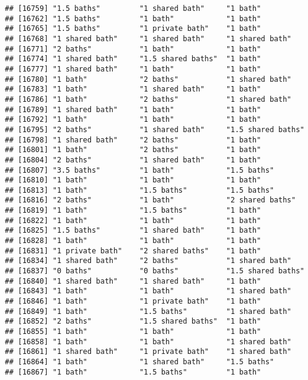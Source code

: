 \documentclass[
]{article}
\begin{document}
\begin{verbatim}
## [16759] "1.5 baths"         "1 shared bath"     "1 bath"           
## [16762] "1.5 baths"         "1 bath"            "1 bath"           
## [16765] "1.5 baths"         "1 private bath"    "1 bath"           
## [16768] "1 shared bath"     "1 shared bath"     "1 shared bath"    
## [16771] "2 baths"           "1 bath"            "1 bath"           
## [16774] "1 shared bath"     "1.5 shared baths"  "1 bath"           
## [16777] "1 shared bath"     "1 bath"            "1 bath"           
## [16780] "1 bath"            "2 baths"           "1 shared bath"    
## [16783] "1 bath"            "1 shared bath"     "1 bath"           
## [16786] "1 bath"            "2 baths"           "1 shared bath"    
## [16789] "1 shared bath"     "1 bath"            "1 bath"           
## [16792] "1 bath"            "1 bath"            "1 bath"           
## [16795] "2 baths"           "1 shared bath"     "1.5 shared baths" 
## [16798] "1 shared bath"     "2 baths"           "1 bath"           
## [16801] "1 bath"            "2 baths"           "1 bath"           
## [16804] "2 baths"           "1 shared bath"     "1 bath"           
## [16807] "3.5 baths"         "1 bath"            "1.5 baths"        
## [16810] "1 bath"            "1 bath"            "1 bath"           
## [16813] "1 bath"            "1.5 baths"         "1.5 baths"        
## [16816] "2 baths"           "1 bath"            "2 shared baths"   
## [16819] "1 bath"            "1.5 baths"         "1 bath"           
## [16822] "1 bath"            "1 bath"            "1 bath"           
## [16825] "1.5 baths"         "1 shared bath"     "1 bath"           
## [16828] "1 bath"            "1 bath"            "1 bath"           
## [16831] "1 private bath"    "2 shared baths"    "1 bath"           
## [16834] "1 shared bath"     "2 baths"           "1 shared bath"    
## [16837] "0 baths"           "0 baths"           "1.5 shared baths" 
## [16840] "1 shared bath"     "1 shared bath"     "1 bath"           
## [16843] "1 bath"            "1 bath"            "1 shared bath"    
## [16846] "1 bath"            "1 private bath"    "1 bath"           
## [16849] "1 bath"            "1.5 baths"         "1 shared bath"    
## [16852] "2 baths"           "1.5 shared baths"  "1 bath"           
## [16855] "1 bath"            "1 bath"            "1 bath"           
## [16858] "1 bath"            "1 bath"            "1 shared bath"    
## [16861] "1 shared bath"     "1 private bath"    "1 shared bath"    
## [16864] "1 bath"            "1 shared bath"     "1.5 baths"        
## [16867] "1 bath"            "1.5 baths"         "1 bath"           

\end{verbatim}
\end{document}
